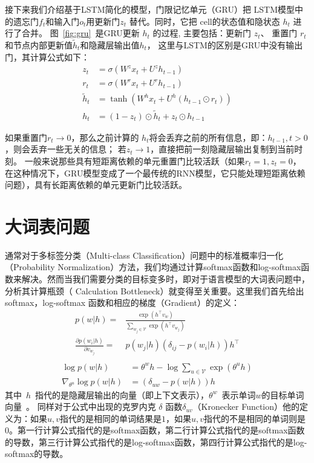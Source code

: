 接下来我们介绍基于LSTM简化的模型，门限记忆单元（GRU）把 LSTM模型中的遗忘门$f_t$和输入门$o_t$用更新门$z_t$ 替代。同时，它把 cell的状态值和隐状态 $h_t$ 进行了合并。 图~\ref{fig:gru}~是GRU更新 $h_t$ 的过程, 主要包括：更新门 $z_t$、 重置门 $r_t$ 和节点内部更新值$\tilde h_t$和隐藏层输出值$h_t$， 这里与LSTM的区别是GRU中没有输出门，其计算公式如下：
\begin{equation}\label{equ:gru}
\begin{split}
   z_t &= \sigma ( W^z x_t+ U^z h_{t-1}) \\
   r_t &= \sigma(W^r x_t  + U^r h_{t-1}  )\\
   \tilde h_t  &= \tanh (W^h x_t  + U^h(h_{t-1} \odot r_t) ) \\
   h_t &= (1-z_t)\odot \tilde h_t  + z_t \odot h_{t-1}
\end{split}
\end{equation}

如果重置门$r_t \to 0$，那么之前计算的 $h_t$将会丢弃之前的所有信息，即：$h_{t-1},t>0$，则会丢弃一些无关的信息； 若$z_t\to 1$，直接把前一刻隐藏层输出复制到当前时刻。 一般来说那些具有短距离依赖的单元重置门比较活跃（如果$r_t=1,z_t=0$， 在这种情况下，GRU模型变成了一个最传统的RNN模型，它只能处理短距离依赖问题），具有长距离依赖的单元更新门比较活跃。



\section{大词表问题}
通常对于多标签分类（Multi-class Classification）问题中的标准概率归一化（Probability Normalization）方法，我们均通过计算softmax函数和log-softmax函数来解决。然而当我们需要分类的目标变多时，即对于语言模型的大词表问题中，分析其计算瓶颈（ Calculation Bottleneck）就变得至关重要。这里我们首先给出 softmax，log-softmax 函数和相应的梯度（Gradient）的定义：
\begin{equation}\label{eq:softmax}
\begin{split}
p(w|h)=&\frac{\exp(h^\top v_{w})}{\sum_{w_j\in \mathcal{V}}{\exp(h^\top v_{w_j} )}} \\
\frac{\partial p(w_i|h)}{\partial v_{w_j}}=&p(w_j|h)(\delta_{ij}-p(w_i|h))h^\top\\
\end{split}
\end{equation}
\begin{equation}
\label{eq:log-softmax}
\begin{split}
\log p(w|h) &= \theta^w h-\log \sum_{u\in \mathcal{V}}{\exp(\theta^u h)}\\
\nabla_{\theta^u}{\log p(w|h)}&= (\delta_{uw}-p(w|h))h
\end{split}
\end{equation}
其中~$h$~指代的是隐藏层输出的向量（即上下文表示），$\theta^w$~表示单词$w$的目标单词向量~。 同样对于公式中出现的克罗内克 $\delta$ 函数$ \delta_{uv}$（Kronecker Function）他的定义为：如果$ u,v $指代的是相同的单词结果是$ 1 $，如果$ u,v $指代的不是相同的单词则是$ 0 $。第一行计算公式指代的是softmax函数，第二行计算公式指代的是softmax函数的导数，第三行计算公式指代的是log-softmax函数，第四行计算公式指代的是log-softmax的导数。


